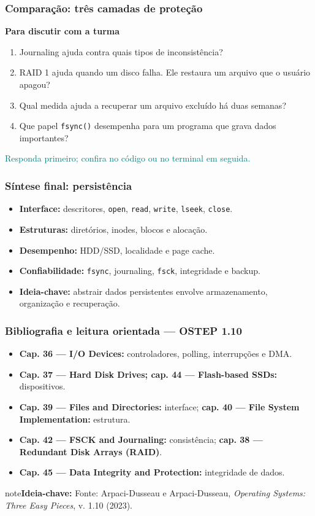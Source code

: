 \documentclass[aspectratio=169,11pt]{beamer}
\begin{document}
\begin{frame}
\frametitle{Comparação: três camadas de proteção}
{\large\textbf{Para discutir com a turma}}\par\medskip\begin{enumerate}\item Journaling ajuda contra quais tipos de inconsistência?
\item RAID 1 ajuda quando um disco falha. Ele restaura um arquivo que o usuário apagou?
\item Qual medida ajuda a recuperar um arquivo excluído há duas semanas?
\item Que papel \texttt{fsync()} desempenha para um programa que grava dados importantes?
\end{enumerate}\vfill\textcolor{teal}{\footnotesize Responda primeiro; confira no código ou no terminal em seguida.}
\end{frame}

\begin{frame}
\frametitle{Síntese final: persistência}
\large
\begin{itemize}
\item \textbf{Interface:} descritores, \texttt{open}, \texttt{read}, \texttt{write}, \texttt{lseek}, \texttt{close}.
\item \textbf{Estruturas:} diretórios, inodes, blocos e alocação.
\item \textbf{Desempenho:} HDD/SSD, localidade e page cache.
\item \textbf{Confiabilidade:} \texttt{fsync}, journaling, \texttt{fsck}, integridade e backup.
\item \textbf{Ideia-chave:} abstrair dados persistentes envolve armazenamento, organização e recuperação.
\end{itemize}

\end{frame}

\begin{frame}
\frametitle{Bibliografia e leitura orientada — OSTEP 1.10}
\large
\begin{itemize}
\item \textbf{Cap. 36 — I/O Devices:} controladores, polling, interrupções e DMA.
\item \textbf{Cap. 37 — Hard Disk Drives; cap. 44 — Flash-based SSDs:} dispositivos.
\item \textbf{Cap. 39 — Files and Directories:} interface; \textbf{cap. 40 — File System Implementation:} estrutura.
\item \textbf{Cap. 42 — FSCK and Journaling:} consistência; \textbf{cap. 38 — Redundant Disk Arrays (RAID)}.
\item \textbf{Cap. 45 — Data Integrity and Protection:} integridade de dados.
\end{itemize}
\vfill\begin{beamercolorbox}[wd=\textwidth,sep=2mm,rounded=true]{note}\small\textbf{Ideia-chave:} Fonte: Arpaci-Dusseau e Arpaci-Dusseau, \textit{Operating Systems: Three Easy Pieces}, v. 1.10 (2023).\end{beamercolorbox}
\end{frame}
\end{document}
